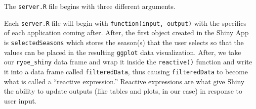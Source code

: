 \documentclass[
  letterpaper,
]{krantz}
\newenvironment{Shaded}{\begin{snugshade}}{\end{snugshade}}
\newcommand{\AttributeTok}[1]{\textcolor[rgb]{0.40,0.45,0.13}{#1}}
\newcommand{\ControlFlowTok}[1]{\textcolor[rgb]{0.00,0.23,0.31}{#1}}
\newcommand{\DecValTok}[1]{\textcolor[rgb]{0.68,0.00,0.00}{#1}}
\newcommand{\FunctionTok}[1]{\textcolor[rgb]{0.28,0.35,0.67}{#1}}
\newcommand{\NormalTok}[1]{\textcolor[rgb]{0.00,0.23,0.31}{#1}}
\newcommand{\OtherTok}[1]{\textcolor[rgb]{0.00,0.23,0.31}{#1}}
\newcommand{\SpecialCharTok}[1]{\textcolor[rgb]{0.37,0.37,0.37}{#1}}
\newcommand{\StringTok}[1]{\textcolor[rgb]{0.13,0.47,0.30}{#1}}
\begin{document}
The \texttt{server.R} file begins with three different arguments.

\begin{Shaded}
\end{Shaded}

Each \texttt{server.R} file will begin with
\texttt{function(input,\ output)} with the specifics of each application
coming after. After, the first object created in the Shiny App is
\texttt{selectedSeasons} which stores the season(s) that the user
selects so that the values can be placed in the resulting
\texttt{ggplot} data visualization. After, we take our
\texttt{ryoe\_shiny} data frame and wrap it inside the
\texttt{reactive()} function and write it into a data frame called
\texttt{filteredData}, thus causing \texttt{filteredData} to become what
is called a ``reactive expression.'' Reactive expressions are what give
Shiny the ability to update outputs (like tables and plots, in our case)
in response to user input.
\end{document}
